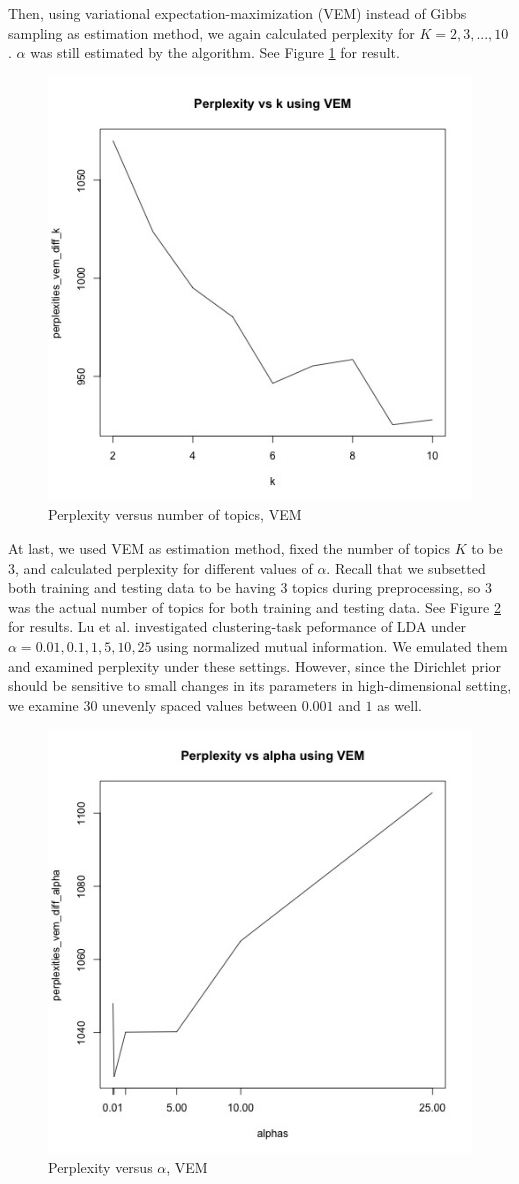\documentclass{article}
\begin{document}
Then, using variational expectation-maximization (VEM) instead of Gibbs sampling as estimation method, we again calculated perplexity for $K = 2, 3, ..., 10$. $\alpha$ was still estimated by the algorithm. See Figure \ref{fig:vem_diff_k_10} for result.

\begin{figure}[h]
  \centering
  \includegraphics[width=0.5\linewidth]{images/vem_diff_k.jpg}
  \caption{Perplexity versus number of topics, VEM}
  \label{fig:vem_diff_k_10}
\end{figure}

At last, we used VEM as estimation method, fixed the number of topics $K$ to be 3, and calculated perplexity for different values of $\alpha$. Recall that we subsetted both training and testing data to be having 3 topics during preprocessing, so 3 was the actual number of topics for both training and testing data. See Figure \ref{fig:vem_diff_alpha} for results. Lu et al. investigated clustering-task peformance of LDA under $\alpha = 0.01, 0.1, 1, 5, 10, 25$ \cite{lu2011investigating} using normalized mutual information. We emulated them and examined perplexity under these settings. However, since the Dirichlet prior should be sensitive to small changes in its parameters in high-dimensional setting, we examine $30$ unevenly spaced values between $0.001$ and $1$ as well.

\begin{figure}[H]
  \centering
  \includegraphics[width=0.5\linewidth]{images/vem_diff_alpha.jpg}
  \caption{Perplexity versus $\alpha$, VEM}
  \label{fig:vem_diff_alpha}
\end{figure}
\end{document}
